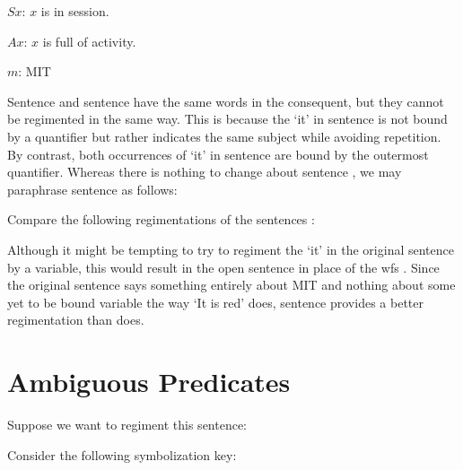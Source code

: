 \begin{ekey}
  \item[$Sx$:] $x$ is in session.
  \item[$Ax$:] $x$ is full of activity.
  \item[$m$:] MIT
\end{ekey}

Sentence  and sentence  have the same words in the consequent, but they cannot be regimented in the same way.
This is because the `it' in sentence  is not bound by a quantifier but rather indicates the same subject while avoiding repetition.
By contrast, both occurrences of `it' in sentence  are bound by the outermost quantifier.
Whereas there is nothing to change about sentence , we may paraphrase sentence  as follows:

\begin{earg} \label{propara}
\end{earg}

Compare the following regimentations of the sentences :

\begin{earg} \label{proreg}
\end{earg}

Although it might be tempting to try to regiment the `it' in the original sentence  by a variable, this would result in the open sentence  in place of the wfs .
Since the original sentence says something entirely about MIT and nothing about some yet to be bound variable the way `It is red' does, sentence  provides a better regimentation than  does.





\section{Ambiguous Predicates}
  \label{sec:ambiguous}

Suppose we want to regiment this sentence:

\begin{earg} \label{amb1}
\end{earg}

Consider the following symbolization key:

